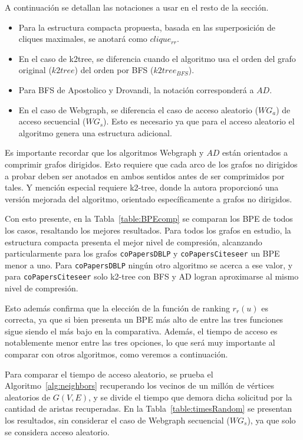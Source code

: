A continuación se detallan las notaciones a usar en el resto de la sección.

\begin{itemize}
	\item Para la estructura compacta propuesta, basada en las superposición de cliques maximales, se anotará como $clique_{rr}$.
	\item En el caso de k2tree, se diferencia cuando el algoritmo usa el orden del grafo original ($k2tree$) del orden por BFS ($k2tree_{BFS}$).
	\item Para BFS de Apostolico y Drovandi, la notación corresponderá a $AD$.
	\item En el caso de Webgraph, se diferencia el caso de acceso aleatorio ($WG_{a}$) de acceso secuencial ($WG_{s}$). Esto es necesario ya que para el acceso aleatorio el algoritmo genera una estructura adicional.
\end{itemize}

Es importante recordar que los algoritmos Webgraph y $AD$ están orientados a comprimir grafos dirigidos. Esto requiere que cada arco de los grafos no dirigidos a probar deben ser anotados en ambos sentidos antes de ser comprimidos por tales. Y mención especial requiere k2-tree, donde la autora proporcionó una versión mejorada del algoritmo, orientado específicamente a grafos no dirigidos.

Con esto presente, en la Tabla~\ref{table:BPEcomp} se comparan los BPE de todos los casos, resaltando los mejores resultados. Para todos los grafos en estudio, la estructura compacta presenta el mejor nivel de compresión, alcanzando particularmente para los grafos \texttt{coPapersDBLP} y \texttt{coPapersCiteseer} un BPE menor a uno. Para \texttt{coPapersDBLP} ningún otro algoritmo se acerca a ese valor, y para \texttt{coPapersCiteseer} solo k2-tree con BFS y AD logran aproximarse al mismo nivel de compresión.

Esto además confirma que la elección de la función de ranking $r_{r}(u)$ es correcta, ya que si bien presenta un BPE más alto de entre las tres funciones sigue siendo el más bajo en la comparativa. Además, el tiempo de acceso es notablemente menor entre las tres opciones, lo que será muy importante al comparar con otros algoritmos, como veremos a continuación.


%

Para comparar el tiempo de acceso aleatorio, se prueba el Algoritmo~\ref{alg:neighbors} recuperando los vecinos de un millón de vértices aleatorios de $G(V, E)$, y se divide el tiempo que demora dicha solicitud por la cantidad de aristas recuperadas. En la Tabla~\ref{table:timesRandom} se presentan los resultados, sin considerar el caso de Webgraph secuencial ($WG_{s}$), ya que solo se considera acceso aleatorio. %

